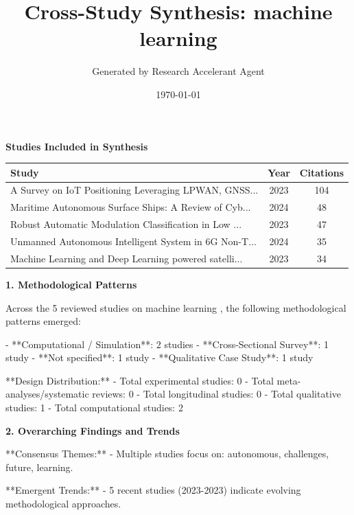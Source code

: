 \documentclass[11pt,a4paper]{article}
\title{\textbf{Cross-Study Synthesis: machine learning }}
\author{Generated by Research Accelerant Agent}
\date{\today}
\begin{document}
\maketitle


\textbf{\large Studies Included in Synthesis}\par\vspace{0.5em}

\begin{longtable}{p{5cm}cc}
\toprule
\textbf{Study} & \textbf{Year} & \textbf{Citations} \\
\midrule
\endhead
A Survey on IoT Positioning Leveraging LPWAN, GNSS... & 2023 & 104 \\
Maritime Autonomous Surface Ships: A Review of Cyb... & 2024 & 48 \\
Robust Automatic Modulation Classification in Low ... & 2023 & 47 \\
Unmanned Autonomous Intelligent System in 6G Non-T... & 2024 & 35 \\
Machine Learning and Deep Learning powered satelli... & 2023 & 34 \\
\bottomrule
\end{longtable}

\vspace{1em}


\textbf{\large 1. Methodological Patterns}\par\vspace{0.5em}

Across the 5 reviewed studies on machine learning , the following methodological patterns emerged:

- **Computational / Simulation**: 2 studies
- **Cross-Sectional Survey**: 1 study
- **Not specified**: 1 study
- **Qualitative Case Study**: 1 study

**Design Distribution:**
- Total experimental studies: 0
- Total meta-analyses/systematic reviews: 0
- Total longitudinal studies: 0
- Total qualitative studies: 1
- Total computational studies: 2

\vspace{1em}


\textbf{\large 2. Overarching Findings and Trends}\par\vspace{0.5em}

**Consensus Themes:**
- Multiple studies focus on: autonomous, challenges, future, learning.

**Emergent Trends:**
- 5 recent studies (2023-2023) indicate evolving methodological approaches.
\end{document}
